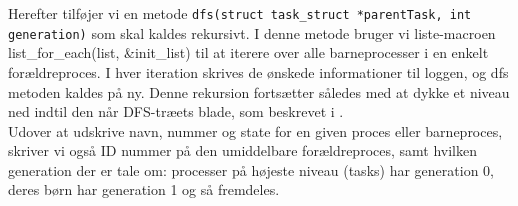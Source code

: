 \documentclass[main.tex]{subfile}
\begin{document}
Herefter tilføjer vi en metode \texttt{dfs(struct task\_struct *parentTask, int generation)} som skal kaldes rekursivt. I denne metode bruger vi liste-macroen list\_for\_each(list, \&init\_list) til at iterere over alle barneprocesser i en enkelt forældreproces. I hver iteration skrives de ønskede informationer til loggen, og dfs metoden kaldes på ny. Denne rekursion fortsætter således med at dykke et niveau ned indtil den når DFS-træets blade, som beskrevet i \cite[s.157, s.114]{SA:2013}.\\

Udover at udskrive navn, nummer og state for en given proces eller barneproces, skriver vi også ID nummer på den umiddelbare forældreproces, samt hvilken generation der er tale om: processer på højeste niveau (tasks) har generation 0, deres børn har generation 1 og så fremdeles.
\end{document}

